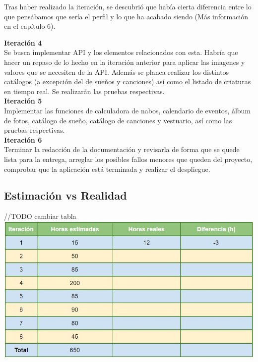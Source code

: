 Tras haber realizado la iteración, se descubrió que había cierta diferencia entre lo que pensábamos que sería el perfil y lo que ha acabado siendo (Más información en el capítulo 6).

\textbf{Iteración 4}\\

Se busca implementar API y los elementos relacionados con esta. Habría que hacer un repaso de lo hecho en la iteración anterior para aplicar las imagenes y valores que se necesiten de la API. Además se planea realizar los distintos catálogos (a excepción del de sueños y canciones) así como el listado de criaturas en tiempo real. Se realizarán las pruebas respectivas.\\

\textbf{Iteración 5}\\

Implementar las funciones de calculadora de nabos, calendario de eventos, álbum de fotos, catálogo de sueño, catálogo de canciones y vestuario, así como las pruebas respectivas.\\

\textbf{Iteración 6}\\

Terminar la redacción de la documentación y revisarla de forma que se quede lista para la entrega, arreglar los posibles fallos menores que queden del proyecto, comprobar que la aplicación está terminada y realizar el despliegue.\\

\subsection{Estimación vs Realidad}

//TODO cambiar tabla
\includegraphics[width=\textwidth]{img/cap4/analisistiempo.jpg}

